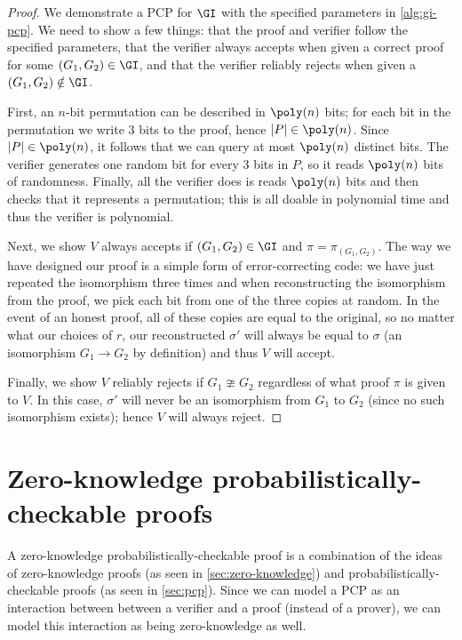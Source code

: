 \documentclass[english,12pt]{reedthesis}
\theoremstyle{plain}
\theoremstyle{definition}
\theoremstyle{remark}
\DeclarePairedDelimiter{\abs}{\lvert}{\rvert}
\begin{document}
\begin{proof}
  We demonstrate a PCP for $\GI$ with the specified parameters in
  \cref{alg:gi-pcp}. We need to show a few things: that the proof and verifier
  follow the specified parameters, that the verifier always accepts when given a
  correct proof for some $(G_{1}, G_{2}) \in \GI$, and that the verifier reliably
  rejects when given a $(G_{1}, G_{2}) \notin \GI$.

  First, an $n$-bit permutation can be described in $\poly(n)$ bits; for each
  bit in the permutation we write 3 bits to the proof, hence
  $\abs{P} \in \poly(n)$. Since $\abs{P} \in \poly(n)$, it follows that we can query
  at most $\poly(n)$ distinct bits. The verifier generates one random bit for
  every 3 bits in $P$, so it reads $\poly(n)$ bits of randomness. Finally, all
  the verifier does is reads $\poly(n)$ bits and then checks that it represents
  a permutation; this is all doable in polynomial time and thus the verifier is
  polynomial.

  Next, we show $V$ always accepts if $(G_{1}, G_{2}) \in \GI$ and
  $\pi = \pi_{(G_{1}, G_{2})}$. The way we have designed our proof is a simple form
  of error-correcting code: we have just repeated the isomorphism three times
  and when reconstructing the isomorphism from the proof, we pick each bit from
  one of the three copies at random. In the event of an honest proof, all of
  these copies are equal to the original, so no matter what our choices of $r$,
  our reconstructed $\sigma'$ will always be equal to $\sigma$ (an isomorphism
  $G_{1} \rightarrow G_{2}$ by definition) and thus $V$ will accept.

  Finally, we show $V$ reliably rejects if $G_{1} \ncong G_{2}$ regardless of what
  proof $\pi$ is given to $V$. In this case, $\sigma'$ will never be an isomorphism
  from $G_{1}$ to $G_{2}$ (since no such isomorphism exists); hence $V$ will
  always reject.
\end{proof}

\section{Zero-knowledge probabilistically-checkable proofs}\label{sec:pzkpcp}

A zero-knowledge probabilistically-checkable proof is a combination of the ideas
of zero-knowledge proofs (as seen in \cref{sec:zero-knowledge}) and
probabilistically-checkable proofs (as seen in \cref{sec:pcp}). Since we can
model a PCP as an interaction between between a verifier and a proof (instead of
a prover), we can model this interaction as being zero-knowledge as well.
\end{document}
